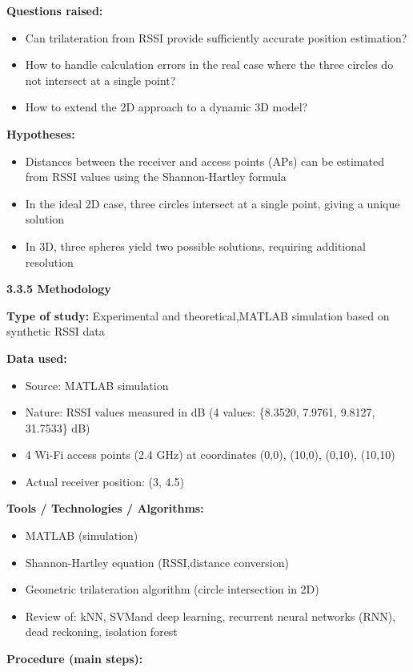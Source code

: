 \documentclass{ipgpmaster}
\begin{document}
\textbf{Questions raised:}

\begin{itemize}
    \item Can trilateration from RSSI provide sufficiently accurate position estimation?
    \item How to handle calculation errors in the real case where the three circles do not intersect at a single point?
    \item How to extend the 2D approach to a dynamic 3D model?
\end{itemize}
\textbf{Hypotheses:}

\begin{itemize}
    \item Distances between the receiver and access points (APs) can be estimated from RSSI values using the Shannon-Hartley formula
    \item In the ideal 2D case, three circles intersect at a single point, giving a unique solution
    \item In 3D, three spheres yield two possible solutions, requiring additional resolution


\end{itemize}
 \textbf{3.3.5   Methodology}

\textbf{Type of study:} Experimental and theoretical,MATLAB simulation based on synthetic RSSI data

\textbf{Data used:}

\begin{itemize}
    \item Source: MATLAB simulation
    \item Nature: RSSI values measured in dB (4 values: \{8.3520, 7.9761, 9.8127, 31.7533\} dB)
    \item 4 Wi-Fi access points (2.4 GHz) at coordinates (0,0), (10,0), (0,10), (10,10)
    \item Actual receiver position: (3, 4.5)
\end{itemize}
\textbf{Tools / Technologies / Algorithms:}

\begin{itemize}
    \item MATLAB (simulation)
    \item Shannon-Hartley equation (RSSI,distance conversion)
    \item Geometric trilateration algorithm (circle intersection in 2D)
    \item Review of: kNN, SVMand  deep learning, recurrent neural networks (RNN), dead reckoning, isolation forest
\end{itemize}
\textbf{Procedure (main steps):}
\end{document}
